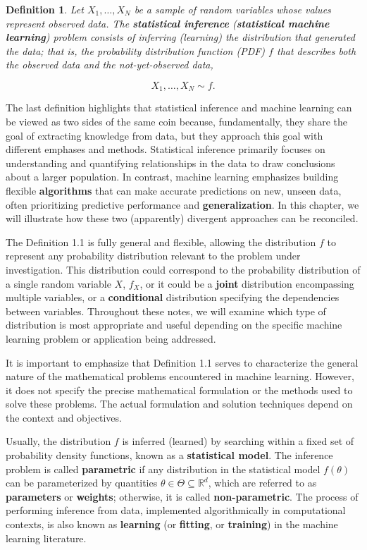 \documentclass{report}
\newtheorem{definition}{Definition}[chapter]
\begin{document}
\begin{definition}
Let $X_1,\dots,X_N$ be a sample of random variables whose values represent observed data. The \textbf{statistical inference} (\textbf{statistical machine learning}) problem consists of inferring (learning) the distribution that generated the data; that is, the probability distribution function (PDF) $f$ that describes both the observed data and the not-yet-observed data,

\begin{equation*}
X_1,\dots,X_N \sim f.
\end{equation*}
\end{definition}
The last definition highlights that statistical inference and machine learning can be viewed as two sides of the same coin because, fundamentally, they share the goal of extracting knowledge from data, but they approach this goal with different emphases and methods.  Statistical inference primarily focuses on understanding and quantifying relationships in the data to draw conclusions about a larger population. In contrast, machine learning emphasizes building flexible \textbf{algorithms} that can make accurate predictions on new, unseen data, often prioritizing predictive performance and \textbf{generalization}. In this chapter, we will illustrate how these two (apparently) divergent approaches can be reconciled.

The Definition 1.1 is fully general and flexible, allowing the distribution $f$ to represent any probability distribution relevant to the problem under investigation. This distribution could correspond to the probability distribution of a single random variable $X$, $f_X$, or it could be a \textbf{joint} distribution encompassing multiple variables, or a \textbf{conditional} distribution specifying the dependencies between variables. Throughout these notes, we will examine which type of distribution is most appropriate and useful depending on the specific machine learning problem or application being addressed.

It is important to emphasize that Definition 1.1 serves to characterize the general nature of the mathematical problems encountered in machine learning. However, it does not specify the precise mathematical formulation or the methods used to solve these problems. The actual formulation and solution techniques depend on the context and objectives.

Usually, the distribution $f$ is inferred (learned) by searching within a fixed set of probability density functions, known as a \textbf{statistical model}. The inference problem is called \textbf{parametric} if any distribution in the statistical model $f(\theta)$ can be parameterized by quantities $\theta \in \Theta \subseteq \mathbb{R}^d$, which are referred to as \textbf{parameters} or \textbf{weights}; otherwise, it is called \textbf{non-parametric}. The process of performing inference from data, implemented algorithmically in computational contexts, is also known as \textbf{learning} (or \textbf{fitting}, or \textbf{training}) in the machine learning literature.
\end{document}
